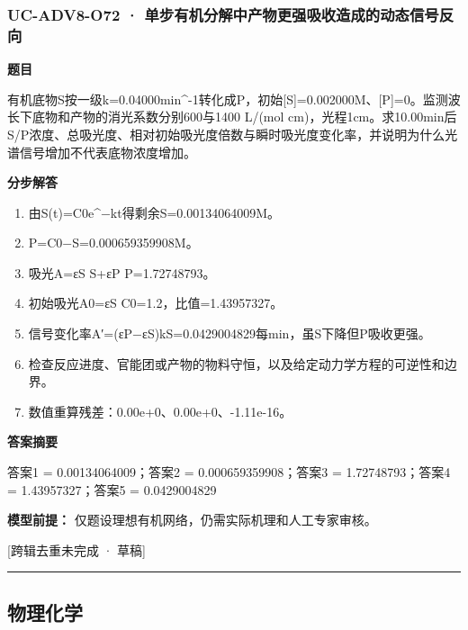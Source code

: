 \documentclass[UTF8,11pt,a4paper]{ctexart}
\begin{document}
\subsubsection*{UC-ADV8-O72 · 单步有机分解中产物更强吸收造成的动态信号反向}
\noindent\textbf{题目}\par
有机底物S按一级k=0.04000min\textasciicircum{}-1转化成P，初始[S]=0.002000M、[P]=0。监测波长下底物和产物的消光系数分别600与1400 L/(mol cm)，光程1cm。求10.00min后S/P浓度、总吸光度、相对初始吸光度倍数与瞬时吸光度变化率，并说明为什么光谱信号增加不代表底物浓度增加。\par
\medskip\noindent\textbf{分步解答}
\begin{enumerate}
\item 由S(t)=C0e\textasciicircum{}−kt得剩余S=0.00134064009M。
\item P=C0−S=0.000659359908M。
\item 吸光A=εS S+εP P=1.72748793。
\item 初始吸光A0=εS C0=1.2，比值=1.43957327。
\item 信号变化率A′=(εP−εS)kS=0.0429004829每min，虽S下降但P吸收更强。
\item 检查反应进度、官能团或产物的物料守恒，以及给定动力学方程的可逆性和边界。
\item 数值重算残差：0.00e+0、0.00e+0、-1.11e-16。
\end{enumerate}
\noindent\textbf{答案摘要}\par
答案1 = 0.00134064009；答案2 = 0.000659359908；答案3 = 1.72748793；答案4 = 1.43957327；答案5 = 0.0429004829\par
\noindent\textbf{模型前提：}
仅题设理想有机网络，仍需实际机理和人工专家审核。\par
\noindent\textcolor{red!65!black}{[跨辑去重未完成 · 草稿]} \par
\medskip\hrule\medskip
\subsection*{物理化学}
\end{document}
